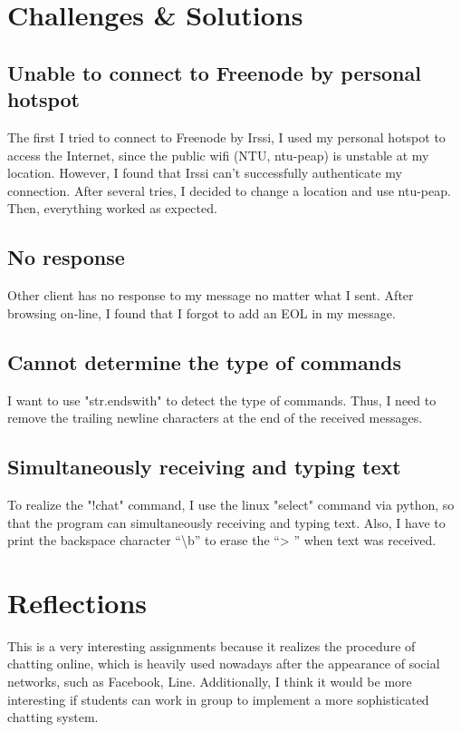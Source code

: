 \documentclass{article}
\begin{document}
\section{Challenges \& Solutions}

\subsection{Unable to connect to Freenode by personal hotspot}
The first I tried to connect to Freenode by Irssi, I used my personal hotspot to access the Internet, since the public wifi (NTU, ntu-peap) is unstable at my location.
However, I found that Irssi can't successfully authenticate my connection.
After several tries, I decided to change a location and use ntu-peap.
Then, everything worked as expected.

\subsection{No response}
Other client has no response to my message no matter what I sent.
After browsing on-line, I found that I forgot to add an EOL in my message.

\subsection{Cannot determine the type of commands}
I want to use "str.endswith" to detect the type of commands.
Thus, I need to remove the trailing newline characters at the end of the received messages.

\subsection{Simultaneously receiving and typing text}
To realize the "!chat" command, I use the linux "select" command via python, so that the program can simultaneously receiving and typing text.
Also, I have to print the backspace character ``\textbackslash b'' to erase the ``> '' when text was received.

\section{Reflections}
This is a very interesting assignments because it realizes the procedure of chatting online, which is heavily used nowadays after the appearance of social networks, such as Facebook, Line.
Additionally, I think it would be more interesting if students can work in group to implement a more sophisticated chatting system.
\end{document}
